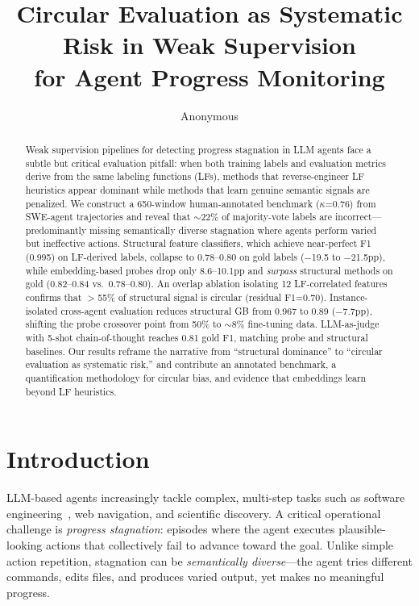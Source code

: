 \documentclass[11pt,a4paper]{article}
\title{Circular Evaluation as Systematic Risk in Weak Supervision\\for Agent Progress Monitoring}
\author{Anonymous}
\begin{document}
\maketitle

\begin{abstract}
Weak supervision pipelines for detecting progress stagnation in LLM agents face a subtle but critical evaluation pitfall: when both training labels and evaluation metrics derive from the same labeling functions (LFs), methods that reverse-engineer LF heuristics appear dominant while methods that learn genuine semantic signals are penalized.
We construct a 650-window human-annotated benchmark ($\kappa$=0.76) from SWE-agent trajectories and reveal that $\sim$22\% of majority-vote labels are incorrect---predominantly missing semantically diverse stagnation where agents perform varied but ineffective actions.
Structural feature classifiers, which achieve near-perfect F1 (0.995) on LF-derived labels, collapse to 0.78--0.80 on gold labels ($-$19.5 to $-$21.5pp), while embedding-based probes drop only 8.6--10.1pp and \emph{surpass} structural methods on gold (0.82--0.84 vs.\ 0.78--0.80).
An overlap ablation isolating 12 LF-correlated features confirms that $>$55\% of structural signal is circular (residual F1=0.70).
Instance-isolated cross-agent evaluation reduces structural GB from 0.967 to 0.89 ($-$7.7pp), shifting the probe crossover point from 50\% to $\sim$8\% fine-tuning data.
LLM-as-judge with 5-shot chain-of-thought reaches 0.81 gold F1, matching probe and structural baselines.
Our results reframe the narrative from ``structural dominance'' to ``circular evaluation as systematic risk,'' and contribute an annotated benchmark, a quantification methodology for circular bias, and evidence that embeddings learn beyond LF heuristics.
\end{abstract}

\section{Introduction}
\label{sec:intro}

LLM-based agents increasingly tackle complex, multi-step tasks such as software engineering~\cite{yang2024swe,wang2024opendevin}, web navigation, and scientific discovery.
A critical operational challenge is \emph{progress stagnation}: episodes where the agent executes plausible-looking actions that collectively fail to advance toward the goal.
Unlike simple action repetition, stagnation can be \emph{semantically diverse}---the agent tries different commands, edits files, and produces varied output, yet makes no meaningful progress.
\end{document}
